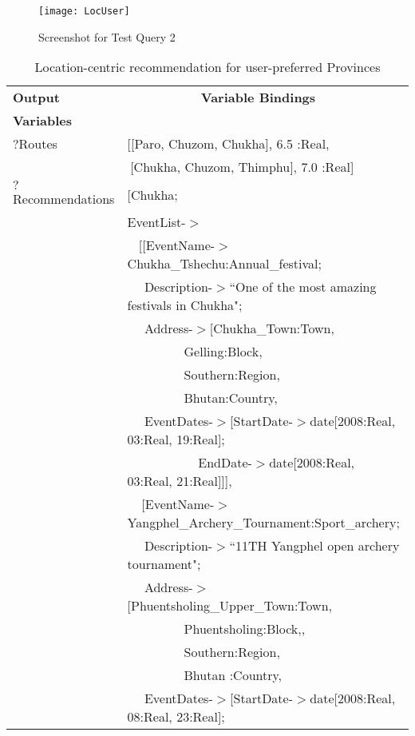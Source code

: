 \begin{figure}
\begin{center}
\texttt{[image: LocUser]}
\caption {Screenshot for Test Query 2}
\label{fig:Fig6.4}
\end{center}
\end{figure}         
\begin{table} [tbph]
\caption{Location-centric recommendation for user-preferred Provinces}
\centering
\footnotesize
\begin{tabular}{|l|l|}
\hline
 \textbf{Output} &$~~~~~~~~~~~~~~~~~~~~~~~~~~$\textbf{Variable Bindings} \\
 \textbf{Variables}&                \\
\hline
 $?$Routes  &[[Paro, Chuzom, Chukha], 6.5 :Real,\\
           &$~$[Chukha, Chuzom, Thimphu], 7.0 :Real]\\
 $?$Recommendations&[Chukha; \\
                   &EventList-$>$\\
  				   &$~~~~$[[EventName-$>$Chukha\_Tshechu:Annual\_festival;\\
				   &$~~~~~~$Description-$>$``One of the most amazing festivals in Chukha";\\
				   &$~~~~~~$Address-$>$[Chukha\_Town:Town, \\
		           &$~~~~~~~~~~~~~~~~~~~~$Gelling:Block, \\
		           &$~~~~~~~~~~~~~~~~~~~~$Southern:Region, \\
		           &$~~~~~~~~~~~~~~~~~~~~$Bhutan:Country,\\
                 &$~~~~~~$EventDates-$>$[StartDate-$>$date[2008:Real, 03:Real, 19:Real];\\
                &$~~~~~~~~~~~~~~~~~~~~~~~~~$EndDate-$>$date[2008:Real, 03:Real, 21:Real]]],\\	   
                  &$~~~~~$[EventName-$>$Yangphel\_Archery\_Tournament:Sport\_archery;\\
				   &$~~~~~~$Description-$>$``11TH Yangphel open archery tournament";\\
				   &$~~~~~~$Address-$>$[Phuentsholing\_Upper\_Town:Town, \\
		         &$~~~~~~~~~~~~~~~~~~~~$Phuentsholing:Block,, \\
		          &$~~~~~~~~~~~~~~~~~~~~$Southern:Region, \\
		           &$~~~~~~~~~~~~~~~~~~~~$Bhutan :Country,\\
                 &$~~~~~~$EventDates-$>$[StartDate-$>$date[2008:Real, 08:Real, 23:Real];\\

\end{tabular}
\end{table}
